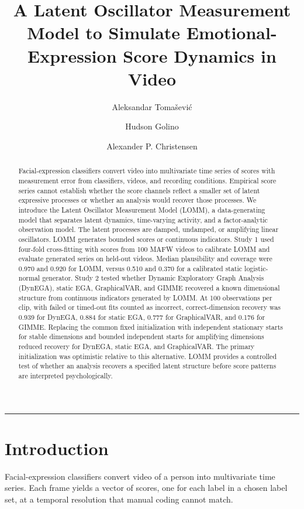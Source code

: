 \documentclass[
]{article}
\title{A Latent Oscillator Measurement Model to Simulate
Emotional-Expression Score Dynamics in Video}
\author{Aleksandar Tomašević \and Hudson Golino \and Alexander P.
Christensen}
\date{}
\begin{document}
\maketitle
\begin{abstract}
Facial-expression classifiers convert video into multivariate time
series of scores with measurement error from classifiers, videos, and
recording conditions. Empirical score series cannot establish whether
the score channels reflect a smaller set of latent expressive processes
or whether an analysis would recover those processes. We introduce the
Latent Oscillator Measurement Model (LOMM), a data-generating model that
separates latent dynamics, time-varying activity, and a factor-analytic
observation model. The latent processes are damped, undamped, or
amplifying linear oscillators. LOMM generates bounded scores or
continuous indicators. Study 1 used four-fold cross-fitting with scores
from 100 MAFW videos to calibrate LOMM and evaluate generated series on
held-out videos. Median plausibility and coverage were 0.970 and 0.920
for LOMM, versus 0.510 and 0.370 for a calibrated static logistic-normal
generator. Study 2 tested whether Dynamic Exploratory Graph Analysis
(DynEGA), static EGA, GraphicalVAR, and GIMME recovered a known
dimensional structure from continuous indicators generated by LOMM. At
100 observations per clip, with failed or timed-out fits counted as
incorrect, correct-dimension recovery was 0.939 for DynEGA, 0.884 for
static EGA, 0.777 for GraphicalVAR, and 0.176 for GIMME. Replacing the
common fixed initialization with independent stationary starts for
stable dimensions and bounded independent starts for amplifying
dimensions reduced recovery for DynEGA, static EGA, and GraphicalVAR.
The primary initialization was optimistic relative to this alternative.
LOMM provides a controlled test of whether an analysis recovers a
specified latent structure before score patterns are interpreted
psychologically.
\end{abstract}


\begin{center}\rule{0.5\linewidth}{0.5pt}\end{center}

\section{Introduction}\label{introduction}

Facial-expression classifiers convert video of a person into
multivariate time series. Each frame yields a vector of scores, one for
each label in a chosen label set, at a temporal resolution that manual
coding cannot match.
\end{document}
